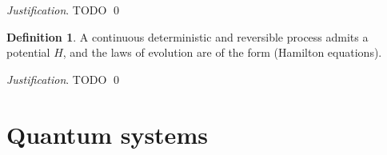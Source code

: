 \documentclass[aps,pra,10pt,twocolumn,floatfix,nofootinbib]{revtex4-1}
\theoremstyle{definition}
\newtheorem{defn}[prop]{Definition}
\newenvironment{justification}{\emph{Justification}.}{\qed}
\begin{document}
\begin{justification}
	TODO
\end{justification}

\begin{defn}\label{hamiltonian}
	A continuous deterministic and reversible process admits a potential $H$, and the laws of evolution are of the form (Hamilton equations).
\end{defn}

\begin{justification}
	TODO
\end{justification}



\section{Quantum systems}

\end{document}
